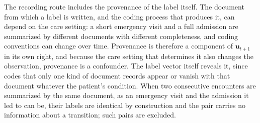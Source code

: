The recording route includes the provenance of the label itself. The document from which a label is written, and the coding process that produces it, can depend on the care setting: a short emergency visit and a full admission are summarized by different documents with different completeness, and coding conventions can change over time. Provenance is therefore a component of $\mathbf{u}_{t+1}$ in its own right, and because the care setting that determines it also changes the observation, provenance is a confounder. The label vector itself reveals it, since codes that only one kind of document records appear or vanish with that document whatever the patient's condition. When two consecutive encounters are summarized by the same document, as an emergency visit and the admission it led to can be, their labels are identical by construction and the pair carries no information about a transition; such pairs are excluded.

